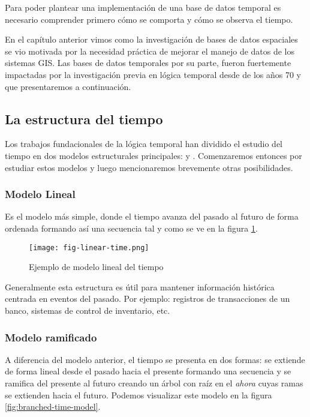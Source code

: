 Para poder plantear una implementación de una base de datos temporal es necesario comprender primero
cómo se comporta y cómo se observa el tiempo.

En el capítulo anterior vimos como la investigación de bases de datos espaciales se vio motivada por
la necesidad práctica de mejorar el manejo de datos de los sistemas GIS.
Las bases de datos temporales por su parte, fueron fuertemente impactadas por
la investigación previa en lógica temporal desde de los años 70\textsuperscript{\cite{temporal:status:directions}}
y que presentaremos a continuación.

\subsection{La estructura del tiempo}

Los trabajos fundacionales de la lógica temporal han dividido el estudio del tiempo en dos modelos estructurales principales:
 y \textsuperscript{\cite{temporal:snodgrass}}.
Comenzaremos entonces por estudiar estos modelos y luego mencionaremos brevemente otras posibilidades.

\subsubsection{Modelo Lineal}

Es el modelo más simple, donde el tiempo avanza del pasado al futuro de forma ordenada formando así una secuencia
tal y como se ve en la figura \ref{fig:linear-time-model}.

\begin{figure}
    \centering
    \texttt{[image: fig-linear-time.png]}
    \caption{Ejemplo de modelo lineal del tiempo}
    \label{fig:linear-time-model}
\end{figure}

Generalmente esta estructura es útil para mantener información histórica centrada en eventos del pasado.
Por ejemplo: registros de transacciones de un banco, sistemas de control de inventario, etc.

\subsubsection{Modelo ramificado}

A diferencia del modelo anterior, el tiempo se presenta en dos formas:
se extiende de forma lineal desde el pasado hacia el presente formando una secuencia
y se ramifica del presente al futuro creando un árbol con raíz en el \textit{ahora} cuyas ramas se extienden hacia el futuro.
Podemos visualizar este modelo en la figura \ref{fig:branched-time-model}.

